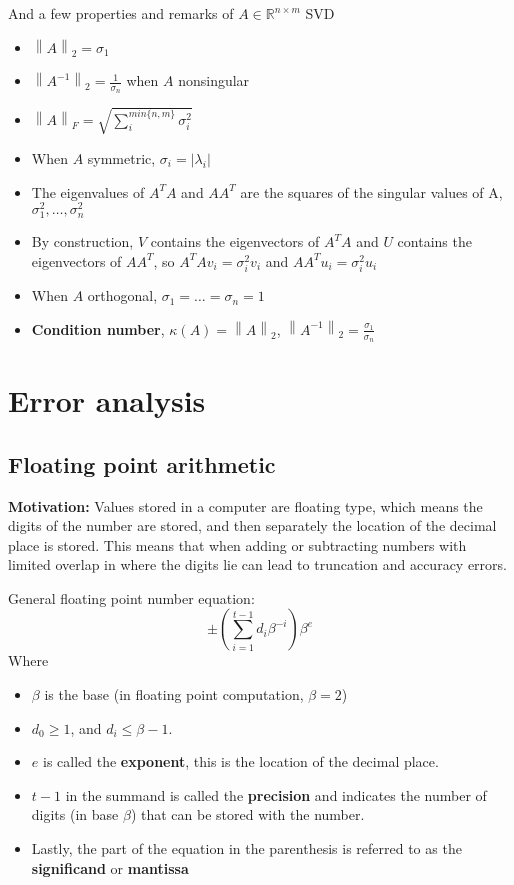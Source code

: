 \documentclass{article}
\newcommand{\norm}[2]{\left\lVert#1\right\rVert_#2}
\newcommand{\abs}[1]{\lvert#1\rvert}
\begin{document}
And a few properties and remarks of $A \in \mathbb{R}^{n\times m}$ SVD
\begin{itemize}
    \item $\norm{A}{2} = \sigma_1$
    \item $\norm{A^{-1}}{2} = \frac{1}{\sigma_n}$ when $A$ nonsingular
    \item $\norm{A}{F} = \sqrt{\sum_i^{min\{n,m\}}\sigma_i^2}$
    \item When $A$ symmetric, $\sigma_i = \abs{\lambda_i}$
    \item The eigenvalues of $A^TA$ and $AA^T$ are the squares of the singular values of A, $\sigma_1^2, \dots, \sigma_n^2$
    \item By construction, $V$ contains the eigenvectors of $A^TA$ and $U$ contains the eigenvectors of $AA^T$, so $A^TAv_i = \sigma_i^2v_i$ and $AA^Tu_i = \sigma_i^2u_i$
    \item When $A$ orthogonal, $\sigma_1 = \dots = \sigma_n = 1$
    \item \textbf{Condition number}, $\kappa(A) = \norm{A}{2}$, $\norm{A^{-1}}{2} = \frac{\sigma_1}{\sigma_n}$
\end{itemize}

\section{Error analysis}
\subsection{Floating point arithmetic}
\textbf{Motivation:} Values stored in a computer are floating type, which means the digits of the number are stored, and then separately the location of the decimal place is stored. This means that when adding or subtracting numbers with limited overlap in where the digits lie can lead to truncation and accuracy errors. 

General floating point number equation:
\begin{equation*}
    \pm (\sum_{i=1}^{t-1} d_i\beta^{-i})\beta^e
\end{equation*}
Where 
\begin{itemize}
    \item$\beta$ is the base (in floating point computation, $\beta=2$)
    \item $d_0\geq1$, and $d_i\leq \beta - 1$. 
    \item $e$ is called the \textbf{exponent}, this is the location of the decimal place. 
    \item $t-1$ in the summand is called the \textbf{precision} and indicates the number of digits (in base $\beta$) that can be stored with the number. 
    \item Lastly, the part of the equation in the parenthesis is referred to as the \textbf{significand} or \textbf{mantissa}
\end{itemize}
\end{document}
